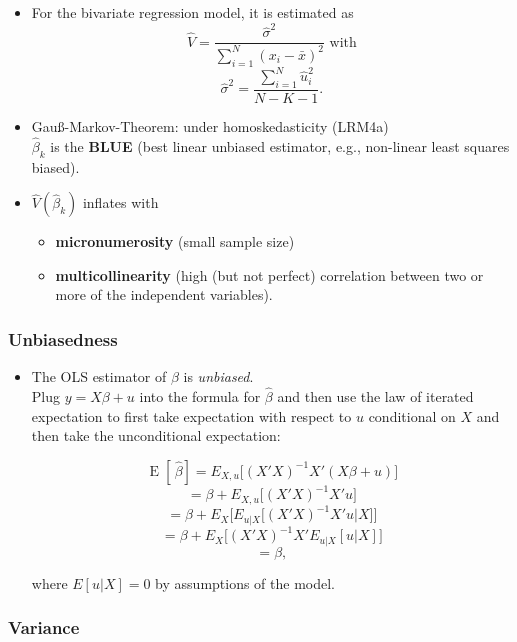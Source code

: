 \documentclass[a4paper,12pt]{article}
\def\emph{\textit}
\begin{document}
\begin{itemize}
\item For the bivariate regression model, it is estimated as
$$\widehat{V}=\frac{\hat{\sigma}^2}{\sum^{N}_{i=1}{(x_i-\bar{x})^2}} \text{ with}$$
$$\hat{\sigma}^2=\frac{\sum^{N}_{i=1}{\hat{u}^2_i}}{N-K-1}.$$
\item Gau{\ss}-Markov-Theorem: under homoskedasticity (LRM4a)\\$\hat{\beta}_k$ is the \textbf{BLUE} (best linear unbiased estimator, e.g., non-linear least squares biased).
\item $\widehat{V}(\hat{\beta}_k)$ inflates with
\begin{itemize}
	\item \textbf{micronumerosity} (small sample size)
	\item \textbf{multicollinearity} (high (but not perfect) correlation between two or more of the independent variables).
\end{itemize}
\end{itemize}



\subsubsection*{Unbiasedness}

\begin{itemize}
\item The OLS estimator of $\beta$ is \emph{unbiased}.\\
Plug $y=X\beta+u$ into the formula for $\hat\beta$ and then use the law of iterated expectation to first take expectation with respect to $u$ conditional
on $X$ and then take the unconditional expectation:

$$\operatorname{E}[\,\hat\beta] = E_{X,u}\Big[(X'X)^{-1}X'(X\beta+u)\Big]$$
$$= \beta + E_{X,u}\Big[(X'X)^{-1}X'u\Big]$$
$$= \beta + E_{X}\Big[E_{u|X}\Big[(X'X)^{-1}X'u|X \Big]\Big] $$
$$= \beta + E_{X}\Big[(X'X)^{-1}X'E_{u|X}[u|X]\Big]$$
$$= \beta,$$

where $E[u|X]=0$ by assumptions of the model.
\end{itemize}



\subsubsection*{Variance}
\end{document}
